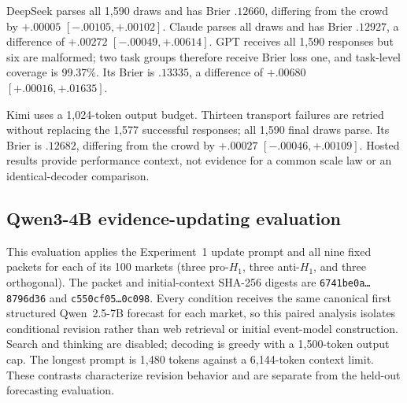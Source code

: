 DeepSeek parses all 1,590 draws and has Brier $.12660$, differing from the crowd by
$+.00005$ $[-.00105,+.00102]$. Claude parses all draws and has Brier $.12927$,
a difference of $+.00272$ $[-.00049,+.00614]$. GPT receives all 1,590
responses but six are malformed; two task groups therefore receive Brier loss
one, and task-level coverage is 99.37\%.
Its Brier is $.13335$, a difference of $+.00680$
$[+.00016,+.01635]$.

Kimi uses a 1,024-token output budget. Thirteen transport failures are retried
without replacing the 1,577 successful responses; all 1,590 final draws parse.
Its Brier is $.12682$, differing from the crowd by $+.00027$
$[-.00046,+.00109]$. Hosted results provide performance context, not evidence
for a common scale law or an identical-decoder comparison.

\subsection{Qwen3-4B evidence-updating evaluation}
\label{app:exp3b-update}
This evaluation applies the Experiment~1 update prompt and all nine fixed packets
for each of its 100 markets (three pro-$H_1$, three
anti-$H_1$, and three orthogonal). The packet and initial-context SHA-256 digests
are \texttt{6741be0a\ldots8796d36} and
\texttt{c550cf05\ldots0c098}. Every condition receives the same canonical first
structured Qwen~2.5-7B forecast for each market, so this paired analysis isolates
conditional revision rather than web retrieval or initial event-model
construction. Search and thinking are disabled; decoding is greedy with a
1,500-token output cap. The longest prompt is 1,480 tokens against a 6,144-token
context limit. These contrasts characterize revision behavior and are separate
from the held-out forecasting evaluation.

